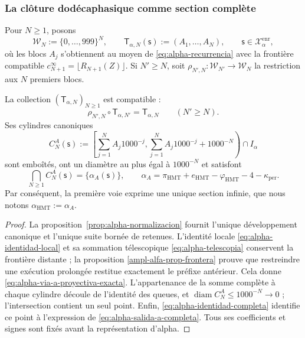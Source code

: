 \subsubsection{La clôture dodécaphasique comme section complète}

Pour \(N\geq1\), posons
\[
 \mathcal W_N:=\{0,\ldots,999\}^{N},
 \qquad
 \mathsf T_{\alpha,N}(\mathsf s):=(A_1,\ldots,A_N),
 \qquad \mathsf s\in\mathcal X_{\alpha}^{\mathrm{enr}},
\]
où les blocs \(A_j\) s'obtiennent au moyen de
\eqref{eq:alpha-recurrencia} avec la frontière compatible
\(c_{N+1}^{\infty}=\lfloor R_{N+1}(Z)\rfloor\). Si \(N'\geq N\), soit
\(\rho_{N',N}:\mathcal W_{N'}\to\mathcal W_N\) la restriction aux
\(N\) premiers blocs.

\begin{theorem}
\label{thm:alpha-salida-dodecafasica-completa}
La collection \((\mathsf T_{\alpha,N})_{N\geq1}\) est compatible :
\begin{equation}
 \rho_{N',N}\circ\mathsf T_{\alpha,N'}
 =\mathsf T_{\alpha,N}
 \qquad(N'\geq N).
 \label{eq:alpha-via-a-proyectiva-exacta}
\end{equation}
Ses cylindres canoniques
\begin{equation}
 C_N^A(\mathsf s):=
 \left[
  \sum_{j=1}^{N}A_j1000^{-j},
  \sum_{j=1}^{N}A_j1000^{-j}+1000^{-N}
 \right)\cap I_\alpha
 \label{eq:alpha-cilindros-via-a-exactos}
\end{equation}
sont emboîtés, ont un diamètre au plus égal à \(1000^{-N}\) et satisfont
\begin{equation}
 \bigcap_{N\geq1}C_N^A(\mathsf s)
 =\{\alpha_A(\mathsf s)\},
 \qquad
 \alpha_A
 =\pi_{\mathrm{HMT}}+e_{\mathrm{HMT}}-\varphi_{\mathrm{HMT}}
  -4-\kappa_{\mathrm{per}}.
 \label{eq:alpha-salida-a-completa}
\end{equation}
Par conséquent, la première voie exprime une unique section infinie, que
nous notons \(\alpha_{\mathrm{HMT}}:=\alpha_A\).
\end{theorem}

\begin{proof}
La proposition~\ref{prop:alpha-normalizacion} fournit l'unique développement
canonique et l'unique suite bornée de retenues. L'identité locale
\eqref{eq:alpha-identidad-local} et sa sommation télescopique
\eqref{eq:alpha-telescopia} conservent la frontière distante ; la proposition
\ref{ampl-alfa-prop-frontera} prouve que restreindre une exécution prolongée
restitue exactement le préfixe antérieur. Cela donne
\eqref{eq:alpha-via-a-proyectiva-exacta}. L'appartenance de la somme complète
à chaque cylindre découle de l'identité des queues, et
\(\operatorname{diam}C_N^A\leq1000^{-N}\to0\) ; l'intersection contient un
seul point. Enfin, \eqref{eq:alpha-identidad-completa} identifie ce
point à l'expression de \eqref{eq:alpha-salida-a-completa}. Tous ses
coefficients et signes sont fixés avant la représentation d'alpha.
\end{proof}


